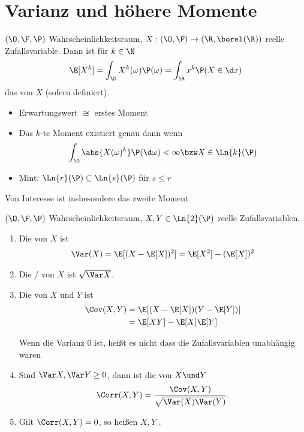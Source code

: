 \section{Varianz und höhere Momente}
\begin{definition}[$k$-te Momente]
	$(\O,\F,\P)$ Wahrscheinlichkeitsraum, $X: (\O,\F) \to (\R, \borel(\R))$ reelle Zufallsvariable. Dann ist für $k \in \N$
	\begin{align*}
		\E[X^k] = \int_{\O} X^k(\omega)\P(\omega) = \int_{\R}x^k \P(X \in \d x)
	\end{align*}
	das  von $X$ (sofern definiert).
\end{definition}
\begin{*remark}
	\begin{itemize}
		\item Erwartungswert $\cong$ erstes Moment
		\item Das $k$-te Moment existiert genau dann wenn
		\begin{align*}
			\int_{\O} \abs{X(\omega)^k}\P(\d \omega) < \infty \bzw X \in \Ln{k}(\P)
		\end{align*}
		\item Mint: $\Ln{r}(\P) \subseteq \Ln{s}(\P)$ für $s \le r$
	\end{itemize}
\end{*remark}
Von Interesse ist insbesondere das zweite Moment
\begin{definition}
	$(\O,\F,\P)$ Wahrscheinlichkeitsraum, $X,Y \in \Ln{2}(\P)$ reelle Zufallsvariablen.
	\begin{enumerate}
		\item Die  von $X$ ist
		\begin{align*}
			\Var (X) = \E[(X - \E[X])^2] = \E[X^2] - (\E[X])^2
		\end{align*}
		\item Die / von $X$ ist $\sqrt{\Var X}$.
		\item Die  von $X$ und $Y$ ist
		\begin{align*}
			\Cov(X,Y) &= \E[(X-\E[X])(Y-\E[Y])]\\
			&= \E[XY] - \E[X]\E[Y]
		\end{align*}
		\begin{*hint}
			Wenn die Varianz 0 ist, heißt es nicht dass die Zufallsvariablen unabhängig waren
		\end{*hint}
		\item Sind $\Var X, \Var Y\ge 0$, dann ist die  von $X \und Y$
		\[
			\Corr(X,Y) = \frac{\Cov(X,Y)}{\sqrt{\Var(X)\Var(Y)}}.
		\] 
		\item Gilt $\Corr(X,Y) =0$, so heißen $X,Y$ .
	\end{enumerate}
\end{definition}
